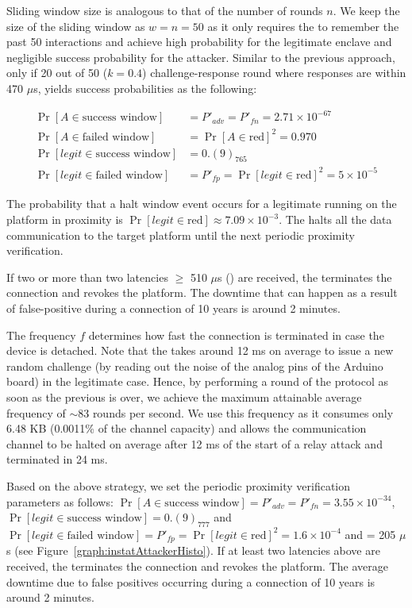  Sliding window size is analogous to that of the number of rounds $n$. We keep  the size of the sliding window as $w=n=50$ as it only requires the \device to remember the past 50 interactions and achieve high probability for the legitimate enclave and negligible success probability for the attacker. Similar to the previous approach, only if 20 out of 50 ($k=0.4$) challenge-response round where responses are within 470 $\mu$s, \name yields success probabilities as the following:

\begin{align*}
 \Pr[A \in \text{success window}]&=P'_{adv} = P'_{fn}= 2.71\times 10^{-67}\\
 \Pr[A \in \text{failed window}]&=\Pr[A\in\text{red}]^2=0.970\\
 \Pr[legit \in \text{success window}]&=0.(9)_765\\
 \Pr[legit \in \text{failed window}]&=P'_{fp}=\Pr[legit\in\text{red}]^2=5\times10^{-5}
\end{align*}

The probability that a halt window event occurs for a legitimate \app running on the platform in proximity is $\Pr[legit\in\text{red}]\approx 7.09\times10^{-3}$. The \device halts all the data communication to the target platform until the next periodic proximity verification.

If two or more than two latencies $\geq$ 510 $\mu$s (\detach) are received, the \device terminates the connection and revokes the platform. The downtime that can happen as a result of false-positive during a connection of 10 years is around 2 minutes.

 The frequency $f$ determines how fast the connection is terminated in case the \device device is detached. Note that the \device takes around 12 ms on average to issue a new random challenge (by reading out the noise of the analog pins of the Arduino board) in the legitimate case. Hence, by performing a round of the protocol as soon as the previous is over, we achieve the maximum attainable average frequency of $\sim$83 rounds per second. We use this frequency as it consumes only 6.48 KB (0.0011\% of the 
channel capacity) and allows the communication channel to be halted on average after 12 ms of the start of a relay attack and terminated in 24 ms.

Based on the above strategy, we set the periodic proximity verification parameters as follows: $\Pr[A \in \text{success window}]=P'_{adv} = P'_{fn}= 3.55\times 10^{-34}$, $\Pr[legit \in \text{success window}]=0.(9)_777$ and $\Pr[legit \in \text{failed window}]=P'_{fp}=\Pr[legit\in\text{red}]^2=1.6\times10^{-4}$ and \detach = 205 $\mu$ s (see Figure~\ref{graph:instatAttackerHisto}). If at least two latencies above \detach are received, the \device terminates the connection and revokes the platform. The average downtime due to false positives occurring during a connection of 10 years is around 2 minutes. 




